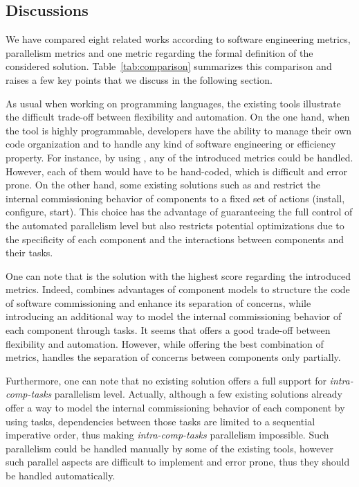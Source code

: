 \subsection{Discussions}

We have compared eight related works according to software engineering metrics, parallelism metrics and one metric regarding the formal definition of the considered solution. Table~\ref{tab:comparison} summarizes this comparison and raises a few key points that we discuss in the following section.

As usual when working on programming languages, the existing tools illustrate the difficult trade-off between flexibility and automation. On the one hand, when the tool is highly programmable, developers have the ability to manage their own code organization and to handle any kind of software engineering or efficiency property. For instance, by using \shell, any of the introduced metrics could be handled. However, each of them would have to be hand-coded, which is difficult and error prone. On the other hand, some existing solutions such as \deployware and \juju restrict the internal commissioning behavior of components to a fixed set of actions (\eg install, configure, start). This choice has the advantage of guaranteeing the full control of the automated parallelism level but also restricts potential optimizations due to the specificity of each component and the interactions between components and their tasks.

One can note that \aeolus is the solution with the highest score regarding the introduced metrics. Indeed, \aeolus combines advantages of component models to structure the code of software commissioning and enhance its separation of concerns, while introducing an additional way to model the internal commissioning behavior of each component through tasks. It seems that \aeolus offers a good trade-off between flexibility and automation. However, while offering the best combination of metrics, \aeolus handles the separation of concerns between components only partially.

Furthermore, one can note that no existing solution offers a full support for \emph{intra-comp-tasks} parallelism level. Actually, although a few existing solutions already offer a way to model the internal commissioning behavior of each component by using tasks, dependencies between those tasks are limited to a sequential imperative order, thus making \emph{intra-comp-tasks} parallelism impossible. Such parallelism could be handled manually by some of the existing tools, however such parallel aspects are difficult to implement and error prone, thus they should be handled automatically.

